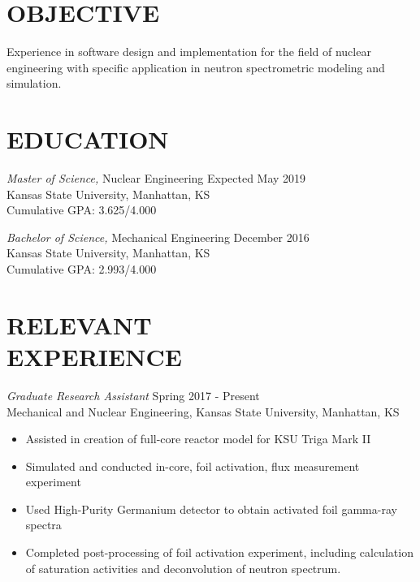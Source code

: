 \documentclass[margin, 10pt]{res} %
\begin{document}
\begin{resume}
 
\section{OBJECTIVE}  

Experience in software design and implementation for the field of nuclear engineering with specific application in neutron spectrometric modeling and simulation.

\section{EDUCATION}

{\sl Master of Science,} Nuclear Engineering \hfill Expected May 2019\\
Kansas State University, Manhattan, KS \\
Cumulative GPA: 3.625/4.000

{\sl Bachelor of Science,} Mechanical Engineering \hfill December 2016 \\
Kansas State University, Manhattan, KS \\
Cumulative GPA: 2.993/4.000


\section{RELEVANT \\ EXPERIENCE}

{\sl Graduate Research Assistant} \hfill Spring 2017 - Present \\
Mechanical and Nuclear Engineering, Kansas State University, Manhattan, KS
\begin{itemize}
    \item Assisted in creation of full-core reactor model for KSU Triga Mark II
    \item Simulated and conducted in-core, foil activation, flux measurement experiment
    \item Used High-Purity Germanium detector to obtain activated foil gamma-ray spectra
    \item Completed post-processing of foil activation experiment, including calculation of saturation activities and deconvolution of neutron spectrum.
\end{itemize}


\end{resume}
\end{document}
